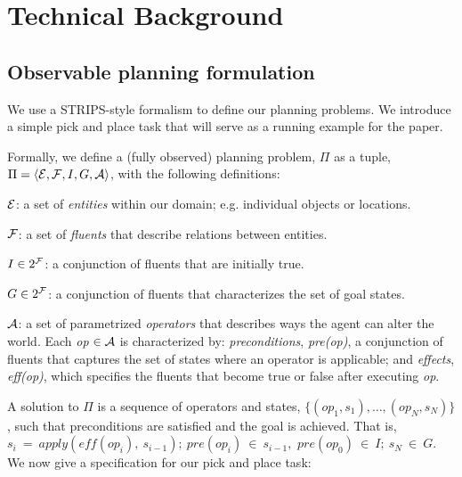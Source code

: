\section{Technical Background}
\subsection{Observable planning formulation}
\label{sec-formulation}
We use a STRIPS-style formalism to define our planning problems. We
introduce a simple pick and place task that will serve as a running
example for the paper. 

Formally, we define a (fully observed) planning problem, $\Pi$ as a tuple, $\Pi =
\langle \mathcal{E}, \mathcal{F}, I, G, \mathcal{A} \rangle$, with the following definitions:
\begin{tightlist}
\item[$\mathcal{E}$:] a set of \emph{entities} within our domain; e.g. individual objects or locations.
\item[$\mathcal{F}$:] a set of \emph{fluents} that describe relations between
  entities.
\item[$I \in 2^{\mathcal{F}}$:] a conjunction of fluents that are initially true.
\item[$G \in 2^{\mathcal{F}}$:] a conjunction of fluents that characterizes the set of goal states.
\item[$\mathcal{A}$:] a set of parametrized \emph{operators} that describes
  ways the agent can alter the world. Each \emph{op} $\in \mathcal{A}$ is characterized by:
  \emph{preconditions}, \emph{pre(op)}, a conjunction of fluents that captures the set of states where an operator is applicable; and \emph{effects}, \emph{eff(op)}, which specifies the fluents that become true or false after executing \emph{op}.
\end{tightlist}
A solution to $\Pi$ is a sequence of operators and states, $\{(op_1,
s_1),\ldots,(op_N, s_N)\}$, such that preconditions are satisfied and
the goal is achieved. That is, $s_i~=~apply(eff(op_i),~s_{i-1});~
pre(op_i)~\in~s_{i-1},$ $pre(op_0)~\in~I;~s_N~\in~G$. We now give
a specification for our pick and place task:
